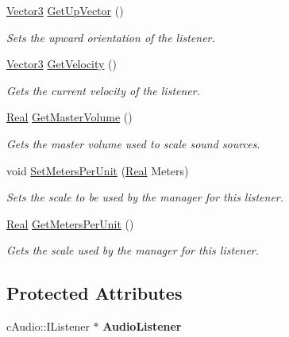 \begin{DoxyCompactItemize}
\hyperlink{classphys_1_1Vector3}{Vector3} \hyperlink{classphys_1_1SoundListener_aff27f90cad8b2eec53e28d28ee2203c3}{GetUpVector} ()
\begin{DoxyCompactList}\small\item\em Sets the upward orientation of the listener. \item\end{DoxyCompactList}\item 
\hyperlink{classphys_1_1Vector3}{Vector3} \hyperlink{classphys_1_1SoundListener_a6b4bbf974c48ba2028bcf2f943a1b1c2}{GetVelocity} ()
\begin{DoxyCompactList}\small\item\em Gets the current velocity of the listener. \item\end{DoxyCompactList}\item 
\hyperlink{namespacephys_af7eb897198d265b8e868f45240230d5f}{Real} \hyperlink{classphys_1_1SoundListener_a03acbadb9e7ebad0014269bf5c3bcf3d}{GetMasterVolume} ()
\begin{DoxyCompactList}\small\item\em Gets the master volume used to scale sound sources. \item\end{DoxyCompactList}\item 
void \hyperlink{classphys_1_1SoundListener_ae5d432f4e1bf7eb788364e7ea0c4e0a6}{SetMetersPerUnit} (\hyperlink{namespacephys_af7eb897198d265b8e868f45240230d5f}{Real} Meters)
\begin{DoxyCompactList}\small\item\em Sets the scale to be used by the manager for this listener. \item\end{DoxyCompactList}\item 
\hyperlink{namespacephys_af7eb897198d265b8e868f45240230d5f}{Real} \hyperlink{classphys_1_1SoundListener_a97c834a1b8fec9ce3a0e705468d531e5}{GetMetersPerUnit} ()
\begin{DoxyCompactList}\small\item\em Gets the scale used by the manager for this listener. \item\end{DoxyCompactList}\end{DoxyCompactItemize}
\subsection*{Protected Attributes}
\begin{DoxyCompactItemize}
\item 
\hypertarget{classphys_1_1SoundListener_ada88acce2006736a00c8eb3a428a3e42}{
cAudio::IListener $\ast$ {\bfseries AudioListener}}
\label{d1/d5a/classphys_1_1SoundListener_ada88acce2006736a00c8eb3a428a3e42}

\end{DoxyCompactItemize}


